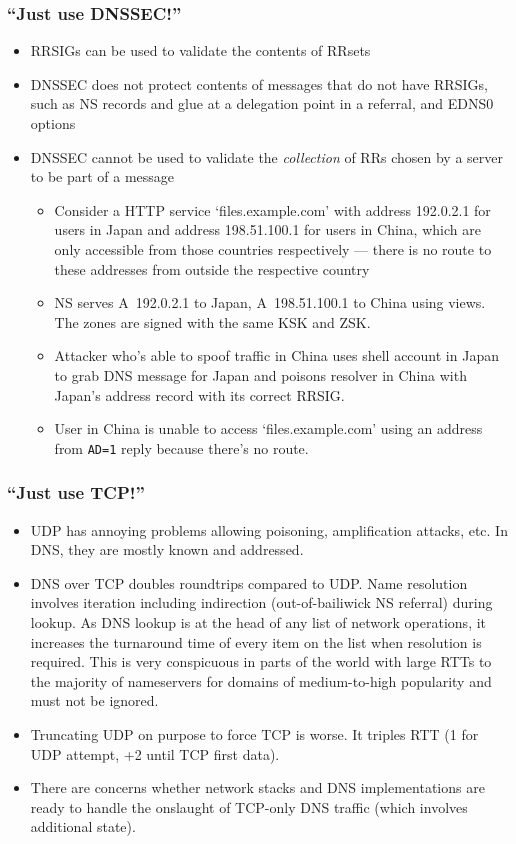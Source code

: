 \documentclass{beamer}
\begin{document}
\frame
{
  \frametitle{``Just use DNSSEC!''}

  \begin{itemize}
  \item RRSIGs can be used to validate the contents of RRsets
  \item DNSSEC does not protect contents of messages that do not have
    RRSIGs, such as NS records and glue at a delegation point in a
    referral, and EDNS0 options
  \item DNSSEC cannot be used to validate the {\em collection} of RRs
    chosen by a server to be part of a message
    \begin{itemize}
    \item Consider a HTTP service `files.example.com' with address
      192.0.2.1 for users in Japan and address 198.51.100.1 for users in
      China, which are only accessible from those countries respectively
      --- there is no route to these addresses from outside the
      respective country
    \item NS serves A~192.0.2.1 to Japan, A~198.51.100.1 to China
      using views. The zones are signed with the same KSK and ZSK.
    \item Attacker who's able to spoof traffic in China uses shell
      account in Japan to grab DNS message for Japan and poisons
      resolver in China with Japan's address record with its correct
      RRSIG.
    \item User in China is unable to access `files.example.com' using an
      address from \texttt{AD=1} reply because there's no route.
    \end{itemize}
  \end{itemize}
}

\frame
{
  \frametitle{``Just use TCP!''}

  \begin{itemize}
  \item UDP has annoying problems allowing poisoning, amplification
    attacks, etc. In DNS, they are mostly known and addressed.
  \item DNS over TCP doubles roundtrips compared to UDP. Name resolution
    involves iteration including indirection (out-of-bailiwick NS
    referral) during lookup. As DNS lookup is at the head of any list of
    network operations, it increases the turnaround time of every item
    on the list when resolution is required. This is very conspicuous in
    parts of the world with large RTTs to the majority of nameservers
    for domains of medium-to-high popularity and must not be ignored.
  \item Truncating UDP on purpose to force TCP is worse. It triples
    RTT (1 for UDP attempt, +2 until TCP first data).
  \item There are concerns whether network stacks and DNS
    implementations are ready to handle the onslaught of TCP-only DNS
    traffic (which involves additional state).
  \end{itemize}
}
\end{document}
